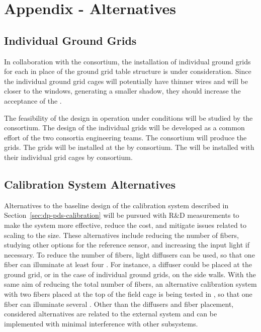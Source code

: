 \newpage

\section{Appendix - Alternatives}
\label{sec:dp-pds-appendix}

\subsection{Individual Ground Grids}
\label{sec:dp-pds-appendix-grid}

In collaboration with the  consortium, the installation of individual ground grids for each  in place of the ground grid table structure is under consideration. Since the individual ground grid cages will potentially have thinner wires and will be closer to the  windows, generating a smaller shadow, they should increase the acceptance of the .

The feasibility of the design in operation under \dune \dual conditions will be studied by the  consortium. The design of the individual grids will be developed as a common effort of the two consortia engineering teams. The  consortium will produce the grids. The grids will be installed at the  by \dual {} consortium. The  will be installed with their individual grid cages by \dual {} consortium. 

\subsection{Calibration System Alternatives}
\label{sec:dp-pds-appendix-calibration}

Alternatives to the baseline design of the calibration system described in Section~\ref{sec:dp-pds-calibration} will be pursued with R\&D measurements to make the system more effective, reduce the cost, and mitigate issues related to scaling to the \dune \dual size. These alternatives include reducing the number of fibers, studying other options for the reference sensor, and increasing the input light if necessary. To reduce the number of fibers, light diffusers can be used, so that one fiber can illuminate at least four . For instance, a diffuser could be placed at the ground grid, or in the case of individual ground grids, on the side walls. With the same aim of reducing the total number of fibers, an alternative calibration system with two fibers placed at the top of the field cage is being tested in , so that one fiber can illuminate several . Other than the diffusers and fiber placement, considered alternatives are related to the external system and can be implemented with minimal interference with other subsystems.

